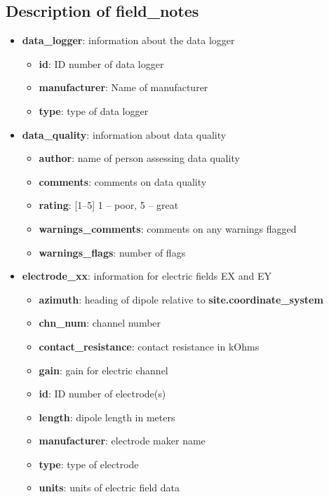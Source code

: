 \documentclass{article}
\newcommand{\attr}[1]{\textbf{#1}}
\begin{document}
\newpage
\subsection{Description of \textbf{field\_notes}}
\begin{itemize}
	\setlength{\itemsep}{.05em}
	\item \attr{data\_logger}: information about the data logger
	\begin{itemize}
		\setlength{\itemsep}{.05em}
		\item \attr{id}: ID number of data logger
		\item \attr{manufacturer}: Name of manufacturer
		\item \attr{type}: type of data logger
	\end{itemize}
	\item \attr{data\_quality}: information about data quality
	\begin{itemize}
		\setlength{\itemsep}{.05em}
		\item \attr{author}: name of person assessing data quality
		\item \attr{comments}: comments on data quality
		\item \attr{rating}: [1--5] 1 -- poor, 5 -- great
		\item \attr{warnings\_comments}: comments on any warnings flagged
		\item \attr{warnings\_flags}: number of flags
	\end{itemize}
	\item \attr{electrode\_xx}: information for electric fields EX and EY
	\begin{itemize}
		\setlength{\itemsep}{.05em}
		\item \attr{azimuth}: heading of dipole relative to \attr{site.coordinate\_system}
		\item \attr{chn\_num}: channel number 
		\item \attr{contact\_resistance}: contact resistance in kOhms
		\item \attr{gain}: gain for electric channel
		\item \attr{id}: ID number of electrode(s)
		\item \attr{length}: dipole length in meters
		\item \attr{manufacturer}: electrode maker name
		\item \attr{type}: type of electrode
		\item \attr{units}: units of electric field data 
	\end{itemize}

\end{itemize}
\end{document}
